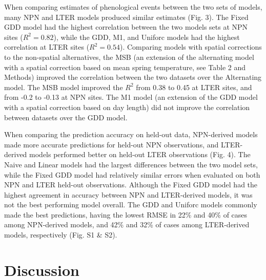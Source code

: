 \documentclass[fleqn,12pt,lineno]{wlpeerj} %
\begin{document}
When comparing estimates of phenological events between the two sets of models, many NPN and LTER models produced similar estimates (Fig. 3). The Fixed GDD model had the highest correlation between the two models sets at NPN sites ($R^2 = 0.82$), while the GDD, M1, and Uniforc models had the highest correlation at LTER sites ($R^2 = 0.54$). Comparing models with spatial corrections to the non-spatial alternatives, the MSB (an extension of the alternating model with a spatial correction based on mean spring temperature, see Table 2 and Methods) improved the correlation between the two datasets over the Alternating model. The MSB model improved the $R^2$ from 0.38 to 0.45 at LTER sites, and from -0.2 to -0.13 at NPN sites. The M1 model (an extension of the GDD model with a spatial correction based on day length) did not improve the correlation between datasets over the GDD model. 

When comparing the prediction accuracy on held-out data, NPN-derived models made more accurate predictions for held-out NPN observations, and LTER-derived models performed better on held-out LTER observations (Fig. 4). The Naive and Linear models had the largest differences between the two model sets, while the Fixed GDD model had relatively similar errors when evaluated on both NPN and LTER held-out observations. Although the Fixed GDD model had the highest agreement in accuracy between NPN and LTER-derived models, it was not the best performing model overall. The GDD and Uniforc models commonly made the best predictions, having the lowest RMSE in 22\% and 40\% of cases among NPN-derived models, and 42\% and 32\% of cases among LTER-derived models, respectively (Fig. S1 \& S2).

\section*{Discussion}
\end{document}
